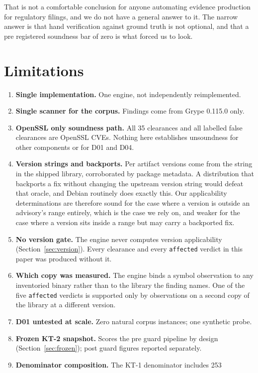 That is not a comfortable conclusion for anyone automating evidence production
for regulatory filings, and we do not have a general answer to it. The narrow
answer is that hand verification against ground truth is not optional, and that a
pre registered soundness bar of zero is what forced us to look.

\section{Limitations}
\label{sec:limits}

\begin{enumerate}
\item \textbf{Single implementation.} One engine, not independently
reimplemented.
\item \textbf{Single scanner for the corpus.} Findings come from Grype 0.115.0
only.
\item \textbf{OpenSSL only soundness path.} All 35 clearances and all labelled
false clearances are OpenSSL CVEs. Nothing here establishes unsoundness for
other components or for D01 and D04.
\item \textbf{Version strings and backports.} Per artifact versions come from
the string in the shipped library, corroborated by package metadata. A
distribution that backports a fix without changing the upstream version string
would defeat that oracle, and Debian routinely does exactly this. Our
applicability determinations are therefore sound for the case where a version is
outside an advisory's range entirely, which is the case we rely on, and weaker
for the case where a version sits inside a range but may carry a backported fix.
\item \textbf{No version gate.} The engine never computes version
applicability (Section~\ref{sec:version}). Every clearance and every
\texttt{affected} verdict in this paper was produced without it.
\item \textbf{Which copy was measured.} The engine binds a symbol observation to
any inventoried binary rather than to the library the finding names. One of the
five \texttt{affected} verdicts is supported only by observations on a second
copy of the library at a different version.
\item \textbf{D01 untested at scale.} Zero natural corpus instances; one
synthetic probe.
\item \textbf{Frozen KT-2 snapshot.} Scores the pre guard pipeline by design
(Section~\ref{sec:frozen}); post guard figures reported separately.
\item \textbf{Denominator composition.} The KT-1 denominator includes 253

\end{enumerate}
